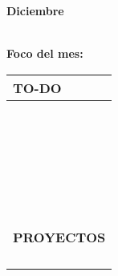 {\raggedleft
	\fontsize{25}{50}\selectfont
	\textbf{Diciembre}\\
}



	\textbf{\\Foco del mes:} \dotfill
	\renewcommand{\arraystretch}{1.5}\scriptsize
		\begin{longtabu} to \textwidth { X[l]}
		\centering \small{\textbf{TO-DO}} \\
		\toprule
		\makebox{$\square$} \dotfill\\
		\makebox{$\square$} \dotfill\\
		\makebox{$\square$} \dotfill\\
		\makebox{$\square$} \dotfill\\
		\makebox{$\square$} \dotfill\\
		\makebox{$\square$} \dotfill\\
		\makebox{$\square$} \dotfill\\
		\makebox{$\square$} \dotfill\\
		\makebox{$\square$} \dotfill\\
		\makebox{$\square$} \dotfill\\
		\makebox{$\square$} \dotfill\\
		\makebox{$\square$} \dotfill\\
		\makebox{$\square$} \dotfill\\
		\makebox{$\square$} \dotfill\\
		\makebox{$\square$} \dotfill\\
		\makebox{$\square$} \dotfill\\
		\makebox{$\square$} \dotfill\\
		\makebox{$\square$} \dotfill\\
		\makebox{$\square$} \dotfill\\
		\makebox{$\square$} \dotfill\\
		\makebox{$\square$} \dotfill\\
		\makebox{$\square$} \dotfill\\
		\makebox{$\square$} \dotfill\\
		\makebox{$\square$} \dotfill\\
		\makebox{$\square$} \dotfill\\

		\bottomrule

		\\
		\small{\textbf{PROYECTOS}} \\
		\makebox{$\square$} \dotfill\\
		\makebox{$\square$} \dotfill\\
		\makebox{$\square$} \dotfill\\
		\makebox{$\square$} \dotfill\\
	\end{longtabu}


